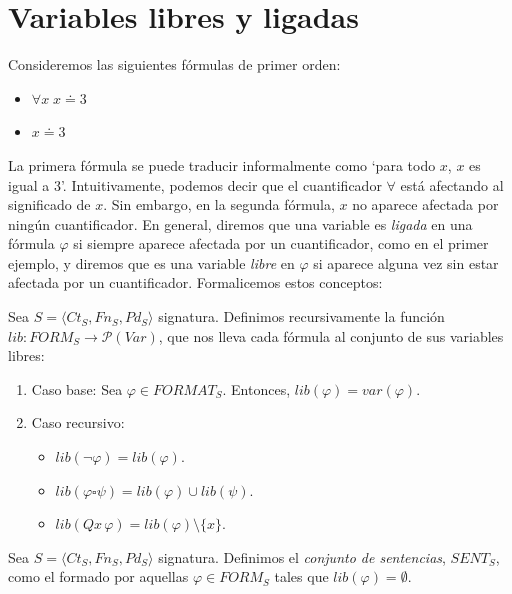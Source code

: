 \section{Variables libres y ligadas}
Consideremos las siguientes fórmulas de primer orden:
\begin{itemize}
    \item $\forall x\;x\doteq3$
    \item $x\doteq3$
\end{itemize}
La primera fórmula se puede traducir informalmente como `para todo $x$, $x$ es igual a 3'. Intuitivamente, podemos decir que el cuantificador $\forall$ está afectando al significado de $x$. Sin embargo, en la segunda fórmula, $x$ no aparece afectada por ningún cuantificador. En general, diremos que una variable es \textit{ligada} en una fórmula $\varphi$ si siempre aparece afectada por un cuantificador, como en el primer ejemplo, y diremos que es una variable \textit{libre} en $\varphi$ si aparece alguna vez sin estar afectada por un cuantificador. Formalicemos estos conceptos:


\begin{definition}
Sea $S = \langle Ct_{S}, Fn_{S}, Pd_{S}\rangle$ signatura. Definimos recursivamente la función $lib: FORM_S \rightarrow \mathcal{P}(Var)$, que nos lleva cada fórmula al conjunto de sus variables libres:
\begin{enumerate}
    \item Caso base: Sea $\varphi \in FORMAT_S$. Entonces, $lib(\varphi) = var(\varphi)$.
    \item Caso recursivo: 
        \begin{itemize}
            \item $lib(\neg \varphi) = lib(\varphi)$.
            \item $lib(\varphi \square \psi) = lib(\varphi) \cup lib(\psi)$.
            \item $lib(Qx \, \varphi) = lib(\varphi) \setminus \{x\}$.
        \end{itemize}
\end{enumerate}
\end{definition}

\begin{definition}
Sea $S = \langle Ct_{S}, Fn_{S}, Pd_{S}\rangle$ signatura. Definimos el \textit{conjunto de sentencias}, $SENT_S$, como el formado por aquellas $\varphi \in FORM_S$ tales que $lib(\varphi) = \emptyset$.
\end{definition}



